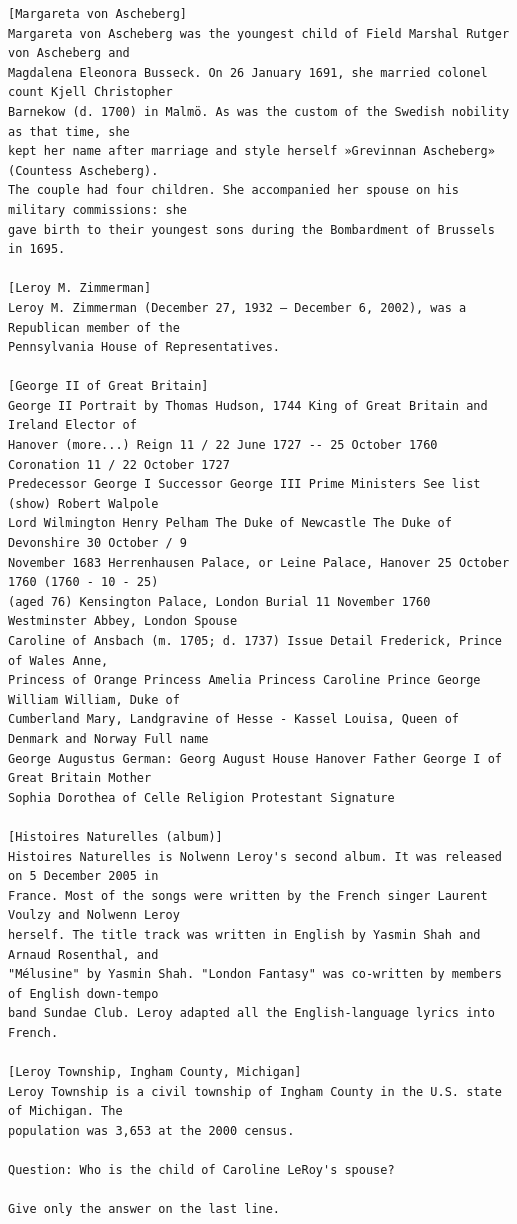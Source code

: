 \documentclass[10pt]{article}
\begin{document}
\begin{verbatim}
[Margareta von Ascheberg]
Margareta von Ascheberg was the youngest child of Field Marshal Rutger von Ascheberg and
Magdalena Eleonora Busseck. On 26 January 1691, she married colonel count Kjell Christopher
Barnekow (d. 1700) in Malmö. As was the custom of the Swedish nobility as that time, she
kept her name after marriage and style herself »Grevinnan Ascheberg» (Countess Ascheberg).
The couple had four children. She accompanied her spouse on his military commissions: she
gave birth to their youngest sons during the Bombardment of Brussels in 1695.

[Leroy M. Zimmerman]
Leroy M. Zimmerman (December 27, 1932 – December 6, 2002), was a Republican member of the
Pennsylvania House of Representatives.

[George II of Great Britain]
George II Portrait by Thomas Hudson, 1744 King of Great Britain and Ireland Elector of
Hanover (more...) Reign 11 / 22 June 1727 -- 25 October 1760 Coronation 11 / 22 October 1727
Predecessor George I Successor George III Prime Ministers See list (show) Robert Walpole
Lord Wilmington Henry Pelham The Duke of Newcastle The Duke of Devonshire 30 October / 9
November 1683 Herrenhausen Palace, or Leine Palace, Hanover 25 October 1760 (1760 - 10 - 25)
(aged 76) Kensington Palace, London Burial 11 November 1760 Westminster Abbey, London Spouse
Caroline of Ansbach (m. 1705; d. 1737) Issue Detail Frederick, Prince of Wales Anne,
Princess of Orange Princess Amelia Princess Caroline Prince George William William, Duke of
Cumberland Mary, Landgravine of Hesse - Kassel Louisa, Queen of Denmark and Norway Full name
George Augustus German: Georg August House Hanover Father George I of Great Britain Mother
Sophia Dorothea of Celle Religion Protestant Signature

[Histoires Naturelles (album)]
Histoires Naturelles is Nolwenn Leroy's second album. It was released on 5 December 2005 in
France. Most of the songs were written by the French singer Laurent Voulzy and Nolwenn Leroy
herself. The title track was written in English by Yasmin Shah and Arnaud Rosenthal, and
"Mélusine" by Yasmin Shah. "London Fantasy" was co-written by members of English down-tempo
band Sundae Club. Leroy adapted all the English-language lyrics into French.

[Leroy Township, Ingham County, Michigan]
Leroy Township is a civil township of Ingham County in the U.S. state of Michigan. The
population was 3,653 at the 2000 census.

Question: Who is the child of Caroline LeRoy's spouse?

Give only the answer on the last line.
\end{verbatim}
\end{document}

